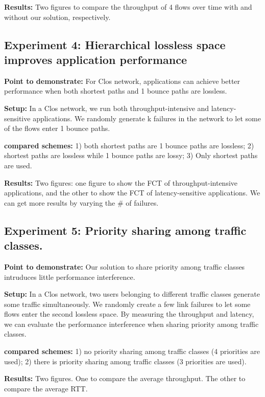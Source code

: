 \textbf{Results:} Two figures to compare the throughput of 4 flows over time with and without our solution, respectively.

\subsection{Experiment 4: Hierarchical lossless space improves application performance}\label{subsec:exp_appperformance}

\textbf{Point to demonstrate:} For Clos network, applications can achieve better performance when both shortest paths and 1 bounce paths are lossless.

\textbf{Setup:} In a Clos network, we run both throughput-intensive and latency-sensitive applications. We randomly generate k failures in the network to let some of the flows enter 1 bounce paths.

 \textbf{compared schemes:} 1) both shortest paths are  1 bounce paths are lossless; 2) shortest paths are lossless while 1 bounce paths are lossy; 3) Only shortest paths are used.

\textbf{Results:} Two figures: one figure to show the FCT of throughput-intensive applications, and the other to show the FCT of latency-sensitive applications. We can get more results by varying the $\#$ of failures.

\subsection{Experiment 5: Priority sharing among  traffic classes.}\label{subsec:exp_prioritysharing}

\textbf{Point to demonstrate:} Our solution to share priority among traffic classes intruduces little performance interference.

\textbf{Setup:} In a Clos network, two users belonging to different traffic classes generate some traffic simultaneously. We randomly create a few link failures to let some flows enter the second lossless space. By measuring the throughput and latency, we can evaluate the performance interference when sharing priority among traffic classes.

 \textbf{compared schemes:} 1) no priority sharing among traffic classes (4 priorities are used); 2) there is priority sharing among traffic classes (3 priorities are used).
 
 \textbf{Results:} Two figures. One to compare the average throughput. The other to 
  compare the average RTT.
  

